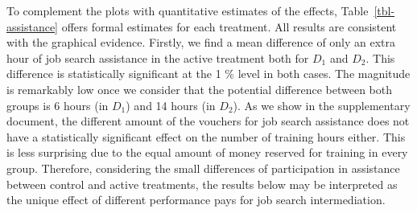 \documentclass[
  11pt]{article}
\begin{document}
To complement the plots with quantitative estimates of the effects,
Table~\ref{tbl-assistance} offers formal estimates for each treatment.
All results are consistent with the graphical evidence. Firstly, we find
a mean difference of only an extra hour of job search assistance in the
active treatment both for \(D_1\) and \(D_2\). This difference is
statistically significant at the 1 \% level in both cases. The magnitude
is remarkably low once we consider that the potential difference between
both groups is 6 hours (in \(D_1\)) and 14 hours (in \(D_2\)). As we
show in the supplementary document, the different amount of the vouchers
for job search assistance does not have a statistically significant
effect on the number of training hours either. This is less surprising
due to the equal amount of money reserved for training in every group.
Therefore, considering the small differences of participation in
assistance between control and active treatments, the results below may
be interpreted as the unique effect of different performance pays for
job search intermediation.

\begin{table}

\caption{\label{tbl-assistance}Estimates of effects for each treatment
assignment at the mean of hours of assistance take-up.}


\end{table}%
\end{document}
